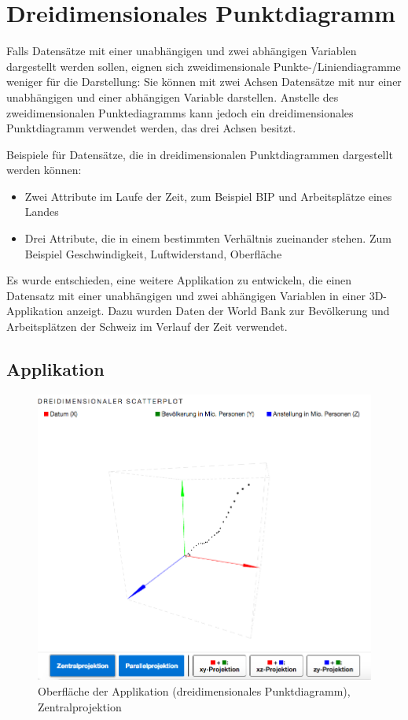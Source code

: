 \section{Dreidimensionales Punktdiagramm}

Falls Datensätze mit einer unabhängigen und zwei abhängigen Variablen dargestellt werden sollen, eignen sich zweidimensionale Punkte-/Liniendiagramme weniger für die Darstellung: Sie können mit zwei Achsen Datensätze mit nur einer unabhängigen und einer abhängigen Variable darstellen. Anstelle des zweidimensionalen Punktediagramms kann jedoch ein dreidimensionales Punktdiagramm verwendet werden, das drei Achsen besitzt.

Beispiele für Datensätze, die in dreidimensionalen Punktdiagrammen dargestellt werden können:

\begin{itemize}
	\item Zwei Attribute im Laufe der Zeit, zum Beispiel BIP und Arbeitsplätze eines Landes
	\item Drei Attribute, die in einem bestimmten Verhältnis zueinander stehen. Zum Beispiel Geschwindigkeit, Luftwiderstand, Oberfläche
\end{itemize}

Es wurde entschieden, eine weitere Applikation zu entwickeln, die einen Datensatz mit einer unabhängigen und zwei abhängigen Variablen in einer 3D-Applikation anzeigt. Dazu wurden Daten der World Bank \cite{worldbank} zur Bevölkerung und Arbeitsplätzen der Schweiz im Verlauf der Zeit verwendet.

\subsection{Applikation}

\begin{figure}[H]
	\centering
	\includegraphics[width=\linewidth]{images/3d}
	\caption{Oberfläche der Applikation (dreidimensionales Punktdiagramm), Zentralprojektion}
	\label{fig:3d}
\end{figure}

